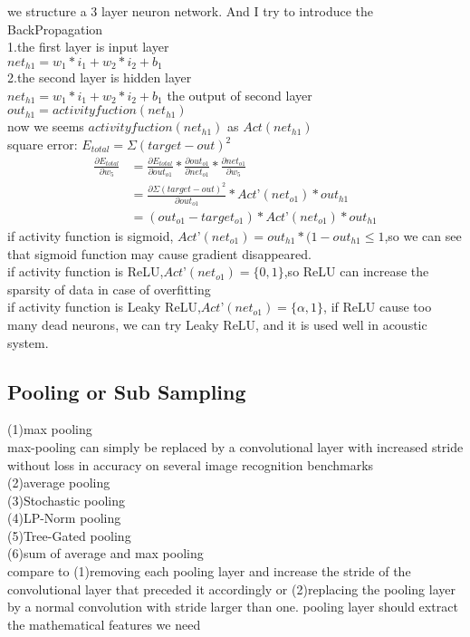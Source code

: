 \documentclass[12pt]{article}
\begin{document}
we structure a 3 layer neuron network. And I try to introduce the BackPropagation\\
1.the first layer is input layer\\ $net_{h1}=w_1*i_1+w_2*i_2+b_1$\\
2.the second layer is hidden layer\\  $net_{h1}=w_1*i_1+w_2*i_2+b_1$
   the output of second layer \\
   $out_{h1}=activityfuction(net_{h1})$\\
   now we seems $activityfuction(net_{h1})$ as $Act(net_{h1})$\\
   square error: $E_{total}=\Sigma(target-out)^2$\\
   \begin{equation*}
   \begin{split}
   \frac{\partial{E_{total}}}{\partial{w_5}}&=\frac{\partial{E_{total}}}{\partial{out_{o1}}}*\frac{\partial{out_{o1}}}{\partial{net_{o1}}}*\frac{\partial{net_{o1}}}{\partial{w_5}}\\&=\frac{\partial{\Sigma(target-out)^2}}{\partial{out_{o1}}}*Act’(net_{o1})*out_{h1}\\&= (out_{o1}-target_{o1})*Act’(net_{o1})*out_{h1}
   \end{split}
   \end{equation*}
if activity function is sigmoid,
$Act’(net_{o1})=out_{h1}*(1-out_{h1} \leq {1}$,so we can see that sigmoid function may cause gradient disappeared.\\
if activity function is ReLU,$Act’(net_{o1})={\{0,1\}}$,so ReLU can increase the sparsity of data in case of overfitting\\
if activity function is Leaky ReLU,$Act’(net_{o1})={\{\alpha,1\}}$, if ReLU cause too many dead neurons, we can try Leaky ReLU, and it is used well in acoustic system.

\subsection{Pooling or Sub Sampling}
(1)max pooling\\
max-pooling can simply be replaced by a convolutional layer with
increased stride without loss in accuracy on several image recognition benchmarks\\
(2)average pooling\\
(3)Stochastic pooling\\
(4)LP-Norm pooling\\
(5)Tree-Gated pooling\\
(6)sum of average and max pooling\\
compare to (1)removing each pooling layer and increase the stride of the convolutional layer that preceded it accordingly or (2)replacing the pooling layer by a normal convolution with stride larger than one.
pooling layer should extract the mathematical features we need
\end{document}

